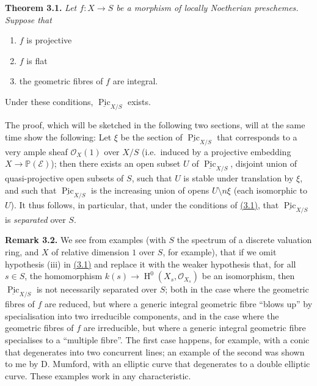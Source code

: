 \documentclass{article}
\providecommand{\tightlist}{%
  \setlength{\itemsep}{0pt}\setlength{\parskip}{0pt}}
\newenvironment{itenv}[1]
  {\phantomsection\par\smallskip\noindent\textbf{#1.}\itshape}
  {\par\smallskip}
\newenvironment{rmenv}[1]
  {\phantomsection\par\smallskip\noindent\textbf{#1.}\rmfamily}
  {\par\smallskip}
\newcommand{\oldpage}[1]{\marginpar{\footnotesize$\Big\vert$ \textit{p.~#1}}}
\theoremstyle{definition}
\theoremstyle{definition}
\theoremstyle{definition}
\theoremstyle{definition}
\theoremstyle{remark}
\begin{document}
\leavevmode{}%
\begin{itenv}{Theorem 3.1}
Let \(f\colon X\to S\) be a morphism of locally Noetherian preschemes.
\oldpage{232-07}Suppose that

\begin{enumerate}
\def\labelenumi{\roman{enumi}.}
\tightlist
\item
  \(f\) is projective
\item
  \(f\) is flat
\item
  the geometric fibres of \(f\) are integral.
\end{enumerate}

Under these conditions, \(\underline{\operatorname{Pic}}_{X/S}\) exists.

\end{itenv}

The proof, which will be sketched in the following two sections, will at the same time show the following:
Let \(\xi\) be the section of \(\underline{\operatorname{Pic}}_{X/S}\) that corresponds to a very ample sheaf \({\mathscr{O}}_X(1)\) over \(X/S\) (i.e.~induced by a projective embedding \(X\to\mathbb{P}({\mathscr{E}})\));
then there exists an open subset \(U\) of \(\underline{\operatorname{Pic}}_{X/S}\), disjoint union of quasi-projective open subsets of \(S\), such that \(U\) is stable under translation by \(\xi\), and such that \(\underline{\operatorname{Pic}}_{X/S}\) is the increasing union of opens \(U\setminus n\xi\) (each isomorphic to \(U\)).
It thus follows, in particular, that, under the conditions of \protect\hyperlink{fga-3-v-theorem-3.1}{(3.1)}, that \(\underline{\operatorname{Pic}}_{X/S}\) is \emph{separated} over \(S\).

\leavevmode{}%
\begin{rmenv}{Remark 3.2}
We see from examples (with \(S\) the spectrum of a discrete valuation ring, and \(X\) of relative dimension \(1\) over \(S\), for example), that if we omit hypothesis (iii) in \protect\hyperlink{fga-3-v-theorem-3.1}{(3.1)} and replace it with the weaker hypothesis that, for all \(s\in S\), the homomorphism \(k(s)\to\operatorname{H}^0(X_s,{\mathscr{O}}_{X_s})\) be an isomorphism, then \(\underline{\operatorname{Pic}}_{X/S}\) is not necessarily separated over \(S\);
both in the case where the geometric fibres of \(f\) are reduced, but where a generic integral geometric fibre ``blows up'' by specialisation into two irreducible components, and in the case where the geometric fibres of \(f\) are irreducible, but where a generic integral geometric fibre specialises to a ``multiple fibre''.
The first case happens, for example, with a conic that degenerates into two concurrent lines; an example of the second was shown to me by D. Mumford, with an elliptic curve that degenerates to a double elliptic curve.
These examples work in any characteristic.

\end{rmenv}
\end{document}
